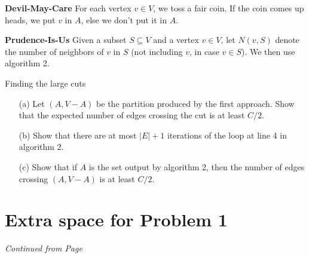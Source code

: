\documentclass[11pt]{article}
\begin{document}
{\bf Devil-May-Care} For each vertex $v \in V$, we toss a fair coin. If the coin
comes up heads, we put $v$ in $A$, else we don't put it in $A$. 

{\bf Prudence-Is-Us} Given a subset $S\subseteq V$ and a vertex $v \in V$, let
$N(v,S)$ denote the number of neighbors of $v$ in $S$ (not including $v$, 
in case $v \in S$). We then use algorithm 2.

\begin{algorithm}
  \caption{Finding the large cuts}
  \begin{algorithmic}
    \Repeat
    \EndIf
  \end{algorithmic}
\end{algorithm}

\begin{itemize}
  \item[(a)] Let $(A,V-A)$ be the partition produced by the first approach.
    Show that the expected number of edges crossing the cut is at least $C/2$.


  \item[(b)] Show that there are at most $|E|+1$ iterations of the loop at
    line 4 in algorithm 2.


  \item[(c)] Show that if $A$ is the set output by algorithm 2, then the number 
    of edges crossing $(A,V-A)$ is at least $C/2$.
\end{itemize}

\label{pg:end-of-p5}


\newpage
  
\section*{Extra space for Problem 1}
\emph{Continued from Page \pageref{pg:end-of-p1}}
\end{document}
